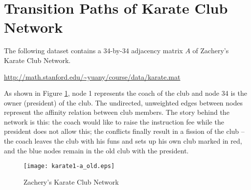 \documentclass[11pt]{article}
\def\rank{{\mathrm{rank}}}
\begin{document}

\section{Transition Paths of Karate Club Network} 
The following dataset contains a 34-by-34 adjacency matrix $A$ of Zachery's Karate Club Network. 

\url{http://math.stanford.edu/~yuany/course/data/karate.mat}

As shown in Figure \ref{fig:karate}, node 1 represents the coach of the club and node 34 is the owner (president) of the club. The undirected, unweighted edges between nodes represent
the affinity relation between club members. The story behind the network is this: the coach would like to raise the instruction fee while the president does not allow this; the conflicts finally result in a fission of the club -- the coach leaves the club with his funs and sets up his own club marked in red, and the blue nodes remain in the old club with the president.  
\begin{figure}[h]
\centering
\texttt{[image: karate1-a\_old.eps]}
\caption{Zachery's Karate Club Network}\label{fig:karate}
\end{figure}
\end{document}

